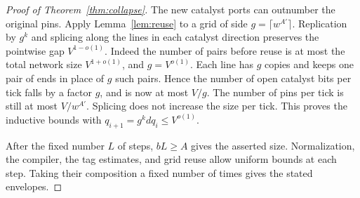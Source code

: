 \begin{proof}[Proof of Theorem~\ref{thm:collapse}]
The new catalyst ports can outnumber the original pins. Apply
Lemma~\ref{lem:reuse} to a grid of side $g=\lceil w^{A'}\rceil$.
Replication by $g^k$ and splicing along the lines in each catalyst
direction preserves the pointwise gap $V^{1-o(1)}$. Indeed the number
of pairs before reuse is at most the total network size
$V^{1+o(1)}$, and $g=V^{o(1)}$. Each line has $g$ copies and keeps
one pair of ends in place of $g$ such pairs. Hence the number of open
catalyst bits per tick falls by a factor $g$, and is now at most
$V/g$. The number of pins per tick is still at most $V/w^{A'}$.
Splicing does not increase the size per tick. This proves the inductive
bounds with $q_{i+1}=g^k d q_i\le V^{o(1)}$.

After the fixed number $L$ of steps, $bL\ge A$ gives the asserted size.
Normalization, the compiler, the tag estimates, and grid reuse allow
uniform bounds at each step. Taking their composition a fixed number
of times gives the stated envelopes.
\end{proof}
